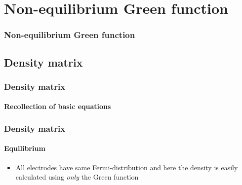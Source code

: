 \section{Non-equilibrium Green function}

\begin{framenologo}
  \frametitle{Non-equilibrium Green function}
  \tableofcontents[currentsection]
\end{framenologo}

\subsection{Density matrix}

\begin{frame}
  \frametitle{Density matrix}
  \framesubtitle{Recollection of basic equations}


\end{frame}

\begin{frame}
  \frametitle{Density matrix}
  \framesubtitle{Equilibrium}

  \begin{itemize}
    \item All electrodes have same Fermi-distribution and here the density is easily
    calculated using \emph{only} the Green function
  \end{itemize}

  
\end{frame}


